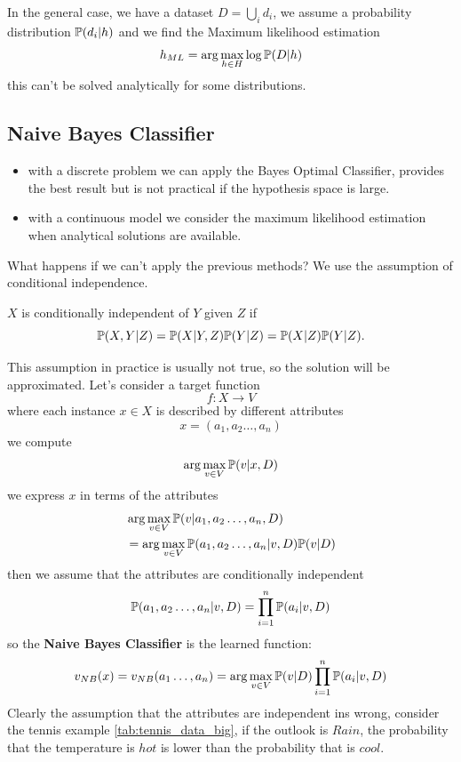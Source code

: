 \documentclass[10pt, letterpaper]{report}
\begin{document}
In the general case, we have a dataset $D=\bigcup_i d_i$, we assume a probability distribution ${\mathbb P}(d_i|h)$ and we find the Maximum likelihood estimation\begin{equation}
    h_{ML}=\arg\max_{h\in H}\log{\mathbb P}(D|h)
\end{equation}
this can't be solved analytically for some distributions.
\subsection{Naive Bayes Classifier}
\begin{itemize}
    \item with a discrete problem we can apply the Bayes Optimal Classifier, provides the best result but is not practical if the hypothesis space is large.
    \item with a continuous model we consider the maximum likelihood estimation when analytical solutions are available.
\end{itemize}
What happens if we can't apply the previous methods? We use the assumption of conditional independence.\begin{definition}
    $X$ is conditionally independent of $Y$ given $Z$ if\begin{equation}
        {\mathbb P}(X, Y|Z)= {\mathbb P}(X|Y,Z){\mathbb P}(Y|Z)={\mathbb P}(X|Z){\mathbb P}(Y|Z).
    \end{equation}
\end{definition}
This assumption in practice is usually not true, so the solution will be approximated.
Let's consider a target function $$f:X\rightarrow V $$ where each instance $x\in X$ is described by different attributes $$x=(a_1,a_2\dots, a_n)$$
we compute\begin{equation}
    \arg\max_{v\in V}{\mathbb P}(v|x,D)
\end{equation}
we express $x$ in terms of the attributes\begin{align}
    &\arg\max_{v\in V}{\mathbb P}(v|a_1,a_2\dots, a_n,D)\\
    &=\arg\max_{v\in V}{\mathbb P}(a_1,a_2\dots, a_n|v,D){\mathbb P}(v|D)
\end{align}
then we assume that the attributes are conditionally independent\begin{equation}
    {\mathbb P}(a_1,a_2\dots, a_n|v,D)=\prod_{i=1}^{n} {\mathbb P}(a_i|v,D)
\end{equation}
so the \textbf{Naive Bayes Classifier} is the learned function:\begin{equation}
    v_{NB}(x)=v_{NB}(a_1\dots, a_n)=\arg\max_{v\in V}{\mathbb P}(v|D)\prod_{i=1}^{n} {\mathbb P}(a_i|v,D)
\end{equation}
Clearly the assumption that the attributes are independent ins wrong, consider the tennis example \ref{tab:tennis_data_big}, if the outlook is $Rain$, the probability that the temperature is $hot$ is lower than the probability that is $cool$.\bigskip
\end{document}
